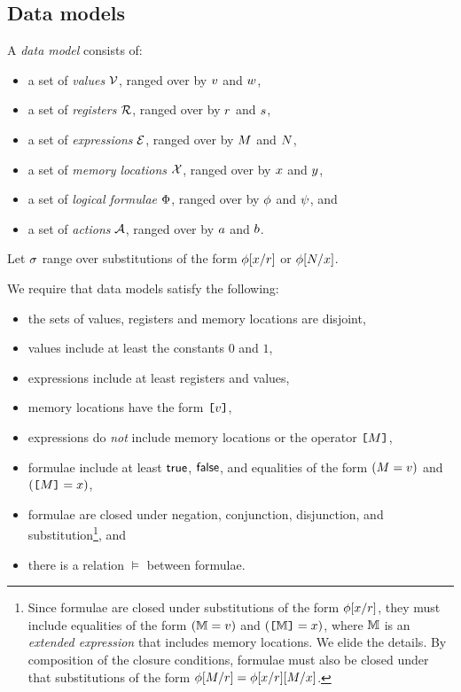 \subsection{Data models}
\label{sec:preliminaries}

A \emph{data model} consists of:
\begin{itemize}
\item a set of \emph{values} $\mathcal{V}$, ranged over by
  $v$ and $w$,
\item a set of \emph{registers} $\mathcal{R}$, ranged over by
  $r$ and $s$,
\item a set of \emph{expressions} $\mathcal{E}$, ranged over by
  $M$ and $N$,
\item a set of \emph{memory locations} $\mathcal{X}$, ranged over by $x$ and
  $y$, 
\item a set of \emph{logical formulae} $\Phi$, ranged over by
  $\phi$ and $\psi$, and
\item a set of \emph{actions} $\mathcal{A}$, ranged over by $a$ and $b$.
\end{itemize}

Let $\sigma$ range over substitutions of the form
$\phi[x/r]$ or $\phi[N/x]$.

We require that data models satisfy the following:
\begin{itemize}
\item the sets of values, registers and memory locations are disjoint,
\item values include at least the constants $0$ and $1$,
\item expressions include at least registers and values,
\item memory locations have the form $\texttt{[}v\texttt{]}$,
\item expressions do \emph{not} include memory locations or the operator $\texttt{[}M\texttt{]}$,
\item formulae include at least $\mathsf{true}$, $\mathsf{false}$, and equalities of the form
  $(M=v)$ and $(\texttt{[}M\texttt{]}=x)$,
\item formulae are closed under negation, conjunction, disjunction, and
  substitution\footnote{Since formulae are closed under substitutions of the
    form $\phi[x/r]$, they must include equalities of the form
    $(\mathbb{M}=v)$ and $(\texttt{[}\mathbb{M}\texttt{]}=x)$, where $\mathbb{M}$ is an
    \emph{extended expression} that includes memory locations.  We elide the
    details.  By composition of the closure conditions, formulae must also be
    closed under that substitutions of the form
    $\phi[M/r]=\phi[x/r][M/x]$.}, and
\item there is a relation $\vDash$ between formulae.
\end{itemize}

